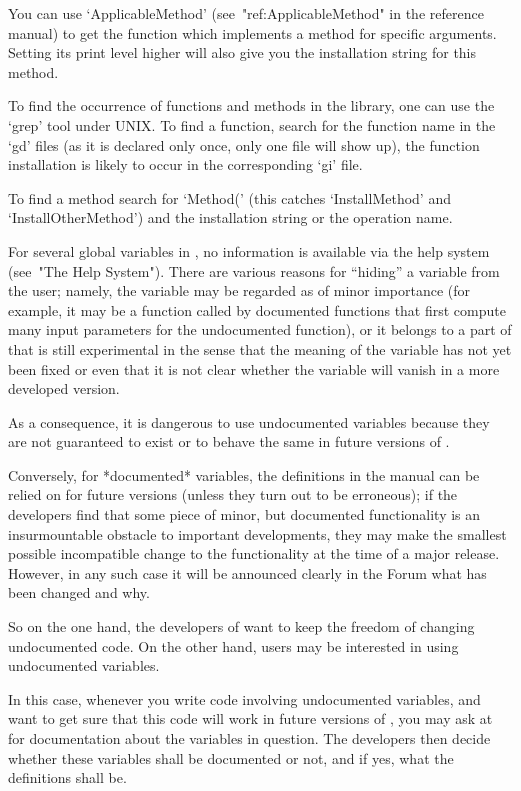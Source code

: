 You can use `ApplicableMethod' (see~"ref:ApplicableMethod" in the reference
manual) to get the function which implements a method for specific
arguments. Setting its print level higher will also give you the
installation string for this method.

To find the occurrence of functions and methods in the library, one can use
the `grep' tool under UNIX. To find a function, search for the function name
in the `gd' files (as it is declared only once, only one file will show up),
the function installation is likely to occur in the corresponding `gi' file.

To find a method search for `Method(' (this catches `InstallMethod' and
`InstallOtherMethod') and the installation string or the operation name.



For several global variables in {\GAP},
no information is available via the help system (see~"The Help System").
There are various reasons for ``hiding'' a variable from the user;
namely, the variable may be regarded as of minor importance
(for example, it may be a function called by documented {\GAP}
functions that first compute many input parameters for the undocumented
function),
or it belongs to a part of {\GAP} that is still experimental in the sense
that the meaning of the variable has not yet been fixed or even that it is
not clear whether the variable will vanish in a more developed version.

As a consequence, it is dangerous to use undocumented variables because
they are not guaranteed to exist or to behave the same in future versions
of {\GAP}.

Conversely, for *documented* variables, the definitions in the {\GAP}
manual can be relied on for future {\GAP} versions (unless they turn out
to be erroneous);
if the {\GAP} developers find that some piece of minor, but documented
functionality is an insurmountable obstacle to important developments,
they may make the smallest possible incompatible change to the functionality
at the time of a major release.
However, in any such case it will be announced clearly in the {\GAP} Forum
what has been changed and why.

So on the one hand, the developers of {\GAP} want to keep the freedom
of changing undocumented {\GAP} code.
On the other hand, users may be interested in using undocumented
variables.

In this case, whenever you write {\GAP} code involving undocumented
variables,
and want to get sure that this code will work in future versions of {\GAP},
you may ask at  for documentation
about the variables in question.
The {\GAP} developers then decide whether these variables shall be
documented or not, and if yes, what the definitions shall be.


